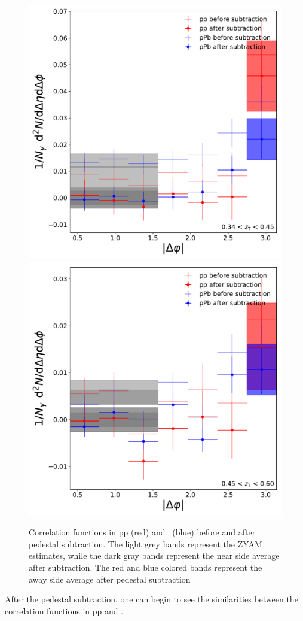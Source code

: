 \begin{figure}
\includegraphics[width = 0.24 \textwidth]{G-H_New/Befor_After_UE_pp-pPb_pT_0_zT_6.pdf}
\includegraphics[width = 0.24 \textwidth]{G-H_New/Befor_After_UE_pp-pPb_pT_0_zT_7.pdf}
\caption{Correlation functions in pp (red) and \pPb~(blue) before and after pedestal subtraction. The light grey bands represent the ZYAM estimates, while the dark gray bands represent the near side average after subtraction. The red and blue colored bands represent the away side average after pedestal subtraction}
\label{fig:BF_UE_zT_second}
\end{figure}

After the pedestal subtraction, one can begin to see the similarities between the correlation functions in pp and \pPb.

\FloatBarrier

